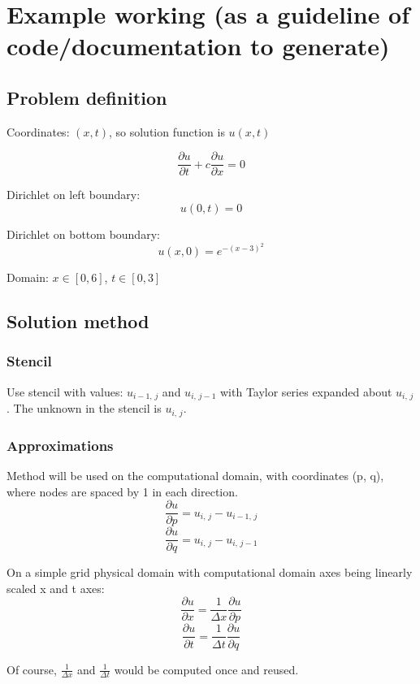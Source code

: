\documentclass[a4paper]{article}
\begin{document}
\newcommand{\diff}[2]{\frac{\partial#1}{\partial#2}}

\section{Example working (as a guideline of code/documentation to generate)}

\subsection{Problem definition}

Coordinates: $(x, t)$, so solution function is $u(x, t)$

$$ \frac{\partial u}{\partial t} + c \frac{\partial u}{\partial x} = 0 $$

Dirichlet on left boundary: 
$$u(0, t) = 0$$

Dirichlet on bottom boundary: 
$$u(x, 0) = e^{-(x-3)^2}$$

Domain: $x \in [0, 6]$, $t \in [0, 3]$


\subsection{Solution method}

\subsubsection{Stencil}
Use stencil with values: $u_{i-1, \,j}$ and $u_{i, \,j-1}$ with Taylor series expanded about $u_{i, \,j}$. The unknown in the stencil is $u_{i, \,j}$.

\subsubsection{Approximations}

Method will be used on the computational domain, with coordinates (p, q), where nodes are spaced by 1 in each direction.
$$\frac{\partial u}{\partial p} = u_{i, \,j} - u_{i-1, \,j}$$
$$\frac{\partial u}{\partial q} = u_{i, \,j} - u_{i, \,j-1}$$

On a simple grid physical domain with computational domain axes being linearly scaled x and t axes:
$$\frac{\partial u}{\partial x} = \frac{1}{\Delta x} \frac{\partial u}{\partial p}$$
$$\frac{\partial u}{\partial t} = \frac{1}{\Delta t} \frac{\partial u}{\partial q}$$

Of course, $\frac{1}{\Delta x}$ and $\frac{1}{\Delta t}$ would be computed once and reused.
\end{document}
